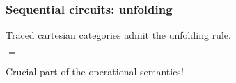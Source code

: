 \begin{frame}
    \frametitle{Sequential circuits: unfolding}

    \pause

    Traced cartesian categories admit the \alert{unfolding} rule.

    \pause
    \vspace{1em}

    \begin{center}
        \pause
        \quad\(=\)\quad
    \end{center}

    \pause

    Crucial part of the operational semantics!
\end{frame}